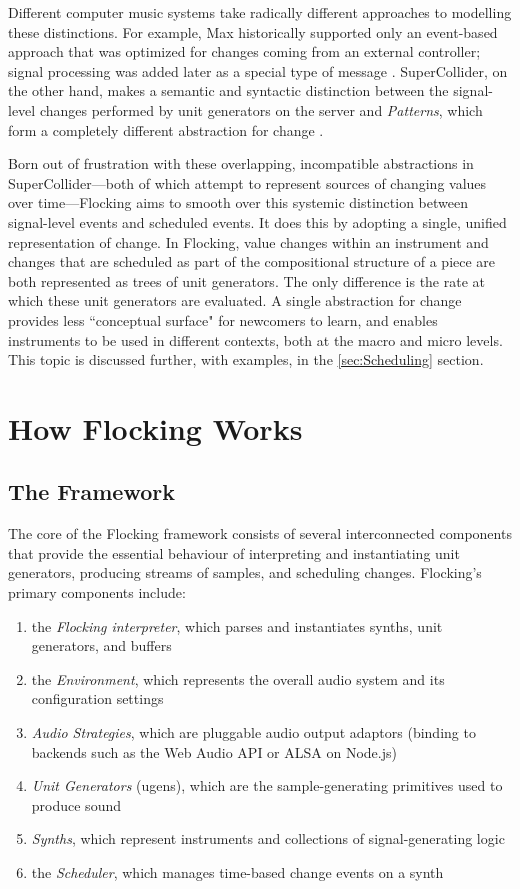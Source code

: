 \documentclass{article}
\begin{document}
Different computer music systems take radically different approaches to modelling these distinctions. For example, Max historically supported only an event-based approach that was optimized for changes coming from an external controller; signal processing was added later as a special type of message \cite{puckette2002max}.
SuperCollider, on the other hand, makes a semantic and syntactic distinction between the signal-level changes performed by unit generators on the server \cite{mccartney1996supercollider} and {\it Patterns}, which form a completely different abstraction for change \cite[pp. 189]{wilson2011supercollider}.

Born out of frustration with these overlapping, incompatible abstractions in SuperCollider---both of which attempt to represent sources of changing values over time---Flocking aims to smooth over this systemic distinction between signal-level events and scheduled events. It does this by adopting a single, unified representation of change. In Flocking, value changes within an instrument and changes that are scheduled as part of the compositional structure of a piece are both represented as trees of unit generators. The only difference is the rate at which these unit generators are evaluated. A single abstraction for change provides less ``conceptual surface" for newcomers to learn, and enables instruments to be used in different contexts, both at the macro and micro levels. This topic is discussed further, with examples, in the \ref{sec:Scheduling} section.

\section{How Flocking Works}

\subsection{The Framework}

The core of the Flocking framework consists of several interconnected components that provide the essential behaviour of interpreting and instantiating unit generators, producing streams of samples, and scheduling changes. Flocking's primary components include:

\begin{enumerate}
\item the {\it Flocking interpreter}, which parses and instantiates synths, unit generators, and buffers
\item the {\it Environment}, which represents the overall audio system and its configuration settings
\item {\it Audio Strategies}, which are pluggable audio output adaptors (binding to backends such as the Web Audio API or ALSA on Node.js)
\item {\it Unit Generators} (ugens), which are the sample-generating primitives used to produce sound
\item {\it Synths}, which represent instruments and collections of signal-generating logic
\item the {\it Scheduler}, which manages time-based change events on a synth
\end{enumerate}
\end{document}
